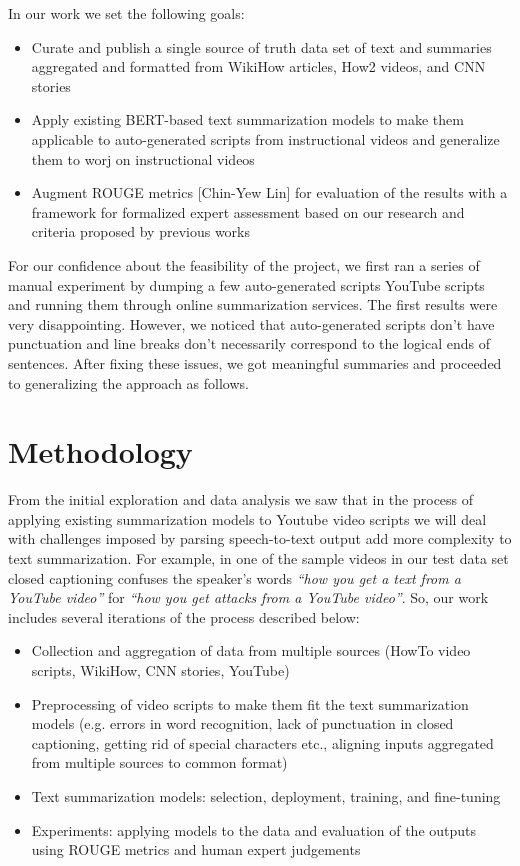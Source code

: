 \documentclass{article}
\begin{document}
In our work we set the following goals:
\begin{itemize}

\item Curate and publish a single source of truth data set of text and summaries aggregated and formatted from WikiHow articles, How2 videos, and CNN stories
\item Apply existing BERT-based text summarization models to make them applicable to auto-generated scripts from instructional videos and generalize them to worj on instructional videos
\item Augment ROUGE metrics [Chin-Yew Lin] for evaluation of the results with a framework for formalized expert assessment based on our research and criteria proposed by previous works 
\end{itemize}

For our confidence about the feasibility of the project, we first ran a series of manual experiment by dumping a few auto-generated scripts YouTube scripts and running them through online summarization services. The first results were very disappointing. However, we noticed that auto-generated scripts don't have punctuation and line breaks don't necessarily correspond to the logical ends of sentences. After fixing these issues, we got meaningful summaries and proceeded to generalizing the approach as follows.
 
\section{Methodology}

From the initial exploration and data analysis we saw that in the process of applying existing summarization models to Youtube video scripts  we will deal with challenges imposed by parsing speech-to-text output add more complexity to text summarization. For example, in one of the sample videos in our test data set closed captioning confuses the speaker’s words \emph{“how you get a text from a YouTube video”} for  \emph{“how you get attacks from a YouTube video”}. So, our work includes several iterations of the process described below:
\begin{itemize}
\item Collection and aggregation of data from multiple sources (HowTo video scripts, WikiHow, CNN stories, YouTube)
\item Preprocessing of video scripts to make them fit the text summarization models (e.g. errors in word recognition, lack of punctuation in closed captioning, getting rid of special characters etc., aligning inputs aggregated from multiple sources  to common format)
\item Text summarization models: selection, deployment, training,  and fine-tuning 
\item Experiments: applying models to the data and evaluation of the outputs using ROUGE metrics and human expert judgements
\end{itemize}
 
\end{document}
